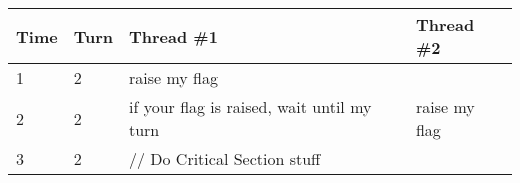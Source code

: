 \begin{longtable}[c]{@{}llll@{}}
\toprule
\begin{minipage}[b]{0.07\columnwidth}\raggedright\strut
Time
\strut\end{minipage} &
\begin{minipage}[b]{0.09\columnwidth}\raggedright\strut
Turn
\strut\end{minipage} &
\begin{minipage}[b]{0.15\columnwidth}\raggedright\strut
Thread \#1
\strut\end{minipage} &
\begin{minipage}[b]{0.14\columnwidth}\raggedright\strut
Thread \#2
\strut\end{minipage}\tabularnewline
\midrule
\endhead
\begin{minipage}[t]{0.07\columnwidth}\raggedright\strut
1
\strut\end{minipage} &
\begin{minipage}[t]{0.09\columnwidth}\raggedright\strut
2
\strut\end{minipage} &
\begin{minipage}[t]{0.15\columnwidth}\raggedright\strut
raise my flag
\strut\end{minipage}\tabularnewline
\begin{minipage}[t]{0.07\columnwidth}\raggedright\strut
2
\strut\end{minipage} &
\begin{minipage}[t]{0.09\columnwidth}\raggedright\strut
2
\strut\end{minipage} &
\begin{minipage}[t]{0.15\columnwidth}\raggedright\strut
if your flag is raised, wait until my turn
\strut\end{minipage} &
\begin{minipage}[t]{0.14\columnwidth}\raggedright\strut
raise my flag
\strut\end{minipage}\tabularnewline
\begin{minipage}[t]{0.07\columnwidth}\raggedright\strut
3
\strut\end{minipage} &
\begin{minipage}[t]{0.09\columnwidth}\raggedright\strut
2
\strut\end{minipage} &
\begin{minipage}[t]{0.15\columnwidth}\raggedright\strut
// Do Critical Section stuff
\strut\end{minipage} &
\begin{minipage}[t]{0.14\columnwidth}\raggedright\strut

\end{minipage}
\end{longtable}
